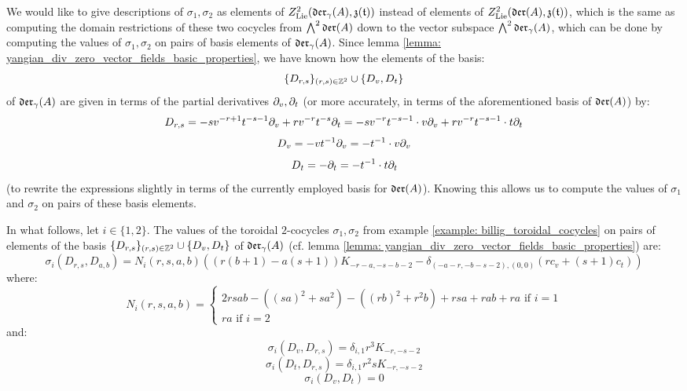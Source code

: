         We would like to give descriptions of $\sigma_1, \sigma_2$ as elements of $Z^2_{\mathrm{Lie}}(\mathfrak{der}_{\gamma}(A), \mathfrak{z}(\mathfrak{t}))$ instead of elements of $Z^2_{\mathrm{Lie}}(\mathfrak{der}(A), \mathfrak{z}(\mathfrak{t}))$, which is the same as computing the domain restrictions of these two cocycles from $\bigwedge^2 \mathfrak{der}(A)$ down to the vector subspace $\bigwedge^2 \mathfrak{der}_{\gamma}(A)$, which can be done by computing the values of $\sigma_1, \sigma_2$ on pairs of basis elements of $\mathfrak{der}_{\gamma}(A)$. Since lemma \ref{lemma: yangian_div_zero_vector_fields_basic_properties}, we have known how the elements of the  basis:
            $$\{D_{r, s}\}_{(r, s) \in \mathbb{Z}^2} \cup \{D_v, D_t\}$$
        of $\mathfrak{der}_{\gamma}(A)$ are given in terms of the partial derivatives $\partial_v, \partial_t$ (or more accurately, in terms of the aforementioned basis of $\mathfrak{der}(A)$) by:
            $$D_{r, s} = -s v^{-r + 1} t^{-s - 1} \partial_v + r v^{-r} t^{-s} \partial_t = -s v^{-r} t^{-s - 1} \cdot v\partial_v + r v^{-r} t^{-s - 1} \cdot t\partial_t$$
            $$D_v = -v t^{-1} \partial_v = -t^{-1} \cdot v\partial_v$$
            $$D_t = -\partial_t = -t^{-1} \cdot t\partial_t$$
        (to rewrite the expressions slightly in terms of the currently employed basis for $\mathfrak{der}(A)$). Knowing this allows us to compute the values of $\sigma_1$ and $\sigma_2$ on pairs of these basis elements.
        \begin{lemma} \label{lemma: billig_toroidal_cocycles_on_yangian_div_zero_vector_fields}
            In what follows, let $i \in \{1, 2\}$. The values of the toroidal $2$-cocycles $\sigma_1, \sigma_2$ from example \ref{example: billig_toroidal_cocycles} on pairs of elements of the basis $\{D_{r, s}\}_{(r, s) \in \mathbb{Z}^2} \cup \{D_v, D_t\}$ of $\mathfrak{der}_{\gamma}(A)$ (cf. lemma \ref{lemma: yangian_div_zero_vector_fields_basic_properties}) are:
                $$\sigma_i(D_{r, s}, D_{a, b}) = N_i(r, s, a, b) \left( ( r(b + 1) - a(s + 1) )K_{-r - a, -s - b - 2} - \delta_{ (-a - r, -b - s - 2), (0, 0) } (r c_v + (s + 1) c_t) \right)$$
            where:
                $$
                    N_i(r, s, a, b) =
                    \begin{cases}
                        \text{$2 rsab - ( (sa)^2 + s a^2 ) - ( (rb)^2 + r^2 b ) + rsa + rab + ra$ if $i = 1$}
                        \\
                        \text{$ra$ if $i = 2$}
                    \end{cases}
                $$
            and:
                $$\sigma_i(D_v, D_{r, s}) = \delta_{i, 1} r^3 K_{-r, -s - 2}$$
                $$\sigma_i(D_t, D_{r, s}) = \delta_{i, 1} r^2 s K_{-r, -s - 2}$$
                $$\sigma_i(D_v, D_t) = 0$$
        \end{lemma}
